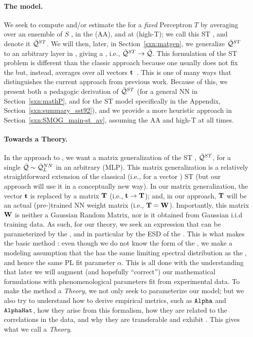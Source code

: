\paragraph{The \StudentTeacher model.}
We seek to compute and/or estimate the \AverageGeneralizationAccuracy for a \emph{fixed} \Teacher Perceptron $T$
by averaging over an ensemble of \Student $S$ \Perceptrons, in the \AnnealedApproximation (AA), and at
\HighTemperature (high-T); we call this ST \ModelQuality, and denote it $\bar{\mathcal{Q}}^{ST}$.
We will then, later, in Section~\ref{sxn:matgen}, we generalize $\bar{\mathcal{Q}}^{ST}$ to an
arbitrary layer in \MultiLayerPerceptron, giving a \LayerQuality, i.e., $\bar{\mathcal{Q}}^{ST}\rightarrow\bar{\mathcal{Q}}$.
This formulation of the ST problem is different than the classic approach because one
usually does not fix the \Teacher but, instead,
averages over all \Teacher vectors ${\mathbf{t}}$~\cite{SST92,engel2001statistical}.
This is one of many ways that distinguishes the current approach from previous work.
Because of this, we present both a pedagogic derivation of $\bar{\mathcal{Q}}^{ST}$
(for a general NN in Section~\ref{sxn:mathP}, and for the ST model specifically
in the Appendix, Section~\ref{sxn:summary_sst92}),
and we provide a more heuristic approach in Section~\ref{sxn:SMOG_main-st_av}, assuming
the AA and high-T at all times.


\paragraph{Towards a \SemiEmpirical Theory.}
In the \SETOL approach to \STATMECH, we want a matrix generalization of the ST \ModelQuality, $\bar{\mathcal{Q}}^{ST}$, for a single \LayerQuality
$\bar{\mathcal{Q}}\sim\bar{\mathcal{Q}}^{NN}_{L}$ in an arbitrary \MultiLayerPerceptron (MLP).
This matrix generalization is a relatively straightforward extension of the classical (i.e., for a vector \Teacher) \SMOG ST \ModelQuality (but our \SETOL approach will use it in a conceptually new way).
%
In our matrix generalization, the \Teacher vector ${\mathbf{t}}$ is replaced by a \Teacher matrix ${\mathbf{T}}$ (i.e., ${\mathbf{t}}\rightarrow{\mathbf{T}}$); 
and, in our \SETOL approach, ${\mathbf{T}}$ will be an actual (pre-)trained NN weight matrix (i.e., ${\mathbf{T}}={\mathbf{W}}$). 
Importantly, this matrix ${\mathbf{W}}$ is neither a Gaussian Random Matrix, nor is it obtained from Gaussian i.i.d training data.
As such, for our \SETOL theory, we seek an expression that can be parameterized by the \Teacher, and in particular by the ESD of the \Teacher.
This is what makes the basic method \SemiEmpirical: even though we do not know the form of the \Teacher,
we make a modeling assumption that the \Teacher has the same limiting spectral distribution as the \Student, 
and hence the same PL fit parameter $\alpha$. 
This is all done with the understanding that later we will augment
(and hopefully ``correct'') our mathematical formulations with 
phenomenological parameters fit from experimental data.
To make the \SemiEmpirical method a \SemiEmpirical \emph{Theory}, 
we not only seek to parameterize our model; but 
we also try to understand 
how to derive \HTSR empirical metrics, such as $\texttt{Alpha}$ and $\texttt{AlphaHat}$,
how they arise from this formalism, 
how they are related to the correlations in the data, and 
why they are transferable and exhibit \Universality.
This gives what we call a \SemiEmpirical \emph{Theory}.
